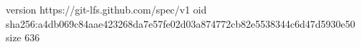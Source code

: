 version https://git-lfs.github.com/spec/v1
oid sha256:a4db069c84aae423268da7e57fe02d03a874772cb82e5538344c6d47d5930e50
size 636
